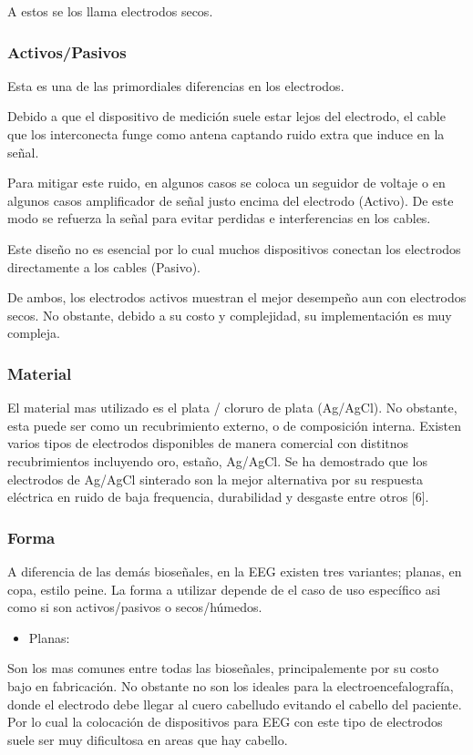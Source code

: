 A estos se los llama electrodos secos.

\subsubsection{Activos/Pasivos}
\label{sec:orgcd09416}
Esta es una de las primordiales diferencias en los electrodos.

Debido a que el dispositivo de medición suele estar lejos del electrodo, el cable que los interconecta funge como antena captando ruido extra que induce en la señal.

Para mitigar este ruido, en algunos casos se coloca un seguidor de voltaje o en algunos casos amplificador de señal justo encima del electrodo (Activo). De este modo se refuerza la señal para evitar perdidas e interferencias en los cables.

Este diseño no es esencial por lo cual muchos dispositivos conectan los electrodos directamente a los cables (Pasivo).

De ambos, los electrodos activos muestran el mejor desempeño aun con electrodos secos. No obstante, debido a su costo y complejidad, su implementación es muy compleja.

\subsubsection{Material}
\label{sec:orga64b93d}
El material mas utilizado es el plata / cloruro de plata (Ag/AgCl). No obstante, esta puede ser como un recubrimiento externo, o de composición interna. Existen varios tipos de electrodos disponibles de manera comercial con distitnos recubrimientos incluyendo oro, estaño, Ag/AgCl. Se ha demostrado que los electrodos de Ag/AgCl sinterado son la mejor alternativa por su respuesta eléctrica en ruido de baja frequencia, durabilidad y desgaste entre otros [6].

\subsubsection{Forma}
\label{sec:orgd60cd58}
A diferencia de las demás bioseñales, en la EEG existen tres variantes; planas, en copa, estilo peine. La forma a utilizar depende de el caso de uso específico asi como si son activos/pasivos o secos/húmedos.

\begin{itemize}
\item Planas:
\end{itemize}
Son los mas comunes entre todas las bioseñales, principalemente por su costo bajo en fabricación. No obstante no son los ideales para la electroencefalografía, donde el electrodo debe llegar al cuero cabelludo evitando el cabello del paciente. Por lo cual la colocación de dispositivos para EEG con este tipo de electrodos suele ser muy dificultosa en areas que hay cabello.

